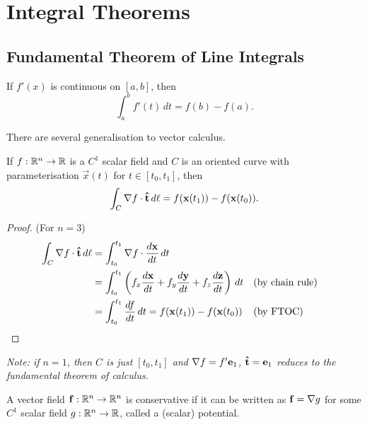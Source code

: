 \documentclass[10pt, a4paper]{article}
\begin{document}
\newpage

\section{Integral Theorems}

\subsection{Fundamental Theorem of Line Integrals}

\begin{theorem}
    If $f'(x)$ is continuous on $[a, b]$,
    then
    \[
    \int_{a}^{b}f'(t)\,dt = f(b) - f(a).
    \]
\end{theorem}
There are several generalisation to vector calculus.

\begin{theorem}
    If $f : \mathbb{R} ^ n \to \mathbb{R}$ is a $C ^ {1}$ scalar field and $C$ is an oriented curve with parameterisation $\vec{x}(t)$ for $t \in [t_0, t_1]$,
    then
    \[
    \int_{C}\mathbf{\nabla} f\cdot \mathbf{\hat{t}}\,d\ell = f(\mathbf{x}(t_1)) - f(\mathbf{x}(t_0)).
    \]

    \begin{proof}
        (For $n = 3$)
        \begin{align*}
            \int_{C}\mathbf{\nabla} f \cdot \mathbf{\hat{t}}\,d\ell &= \int_{t_0}^{t_1}\mathbf{\nabla} f \cdot \frac{d\mathbf{x}}{dt}\,dt \\
            &= \int_{t_0}^{t_1}\left(f_x\frac{d\mathbf{x}}{dt} + f_y\frac{d\mathbf{y}}{dt} + f_z\frac{d\mathbf{z}}{dt}\right)\,dt &&(\text{by chain rule}) \\
            &= \int_{t_0}^{t_1}\frac{df}{dt}\,dt = f(\mathbf{x}(t_1)) - f(\mathbf{x}(t_0)) &&(\text{by FTOC})
        \end{align*}
    \end{proof}
\end{theorem}

\textit{Note:
if $n = 1$,
then $C$ is just $[t_0, t_1]$ and $\mathbf{\nabla} f = f'\mathbf{e}_1$,
$\mathbf{\hat{t}} = \mathbf{e}_1$ reduces to the fundamental theorem of calculus.}

A vector field $\mathbf{f} : \mathbb{R} ^ n \to \mathbb{R} ^ n$ is conservative if it can be written as $\mathbf{f} = \mathbf{\nabla} g$ for some $C ^ {1}$ scalar field $g : \mathbb{R} ^ n \to \mathbb{R}$,
called a
(scalar)
potential.
\end{document}
